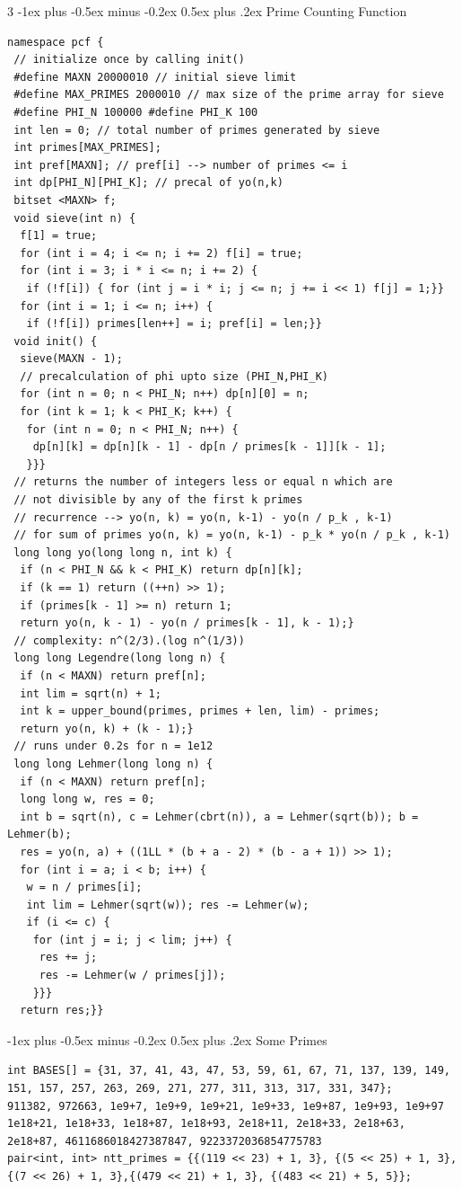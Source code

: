 \documentclass[8pt,a4paper,onesided]{article}
\makeatletter
\renewcommand{\subsection}{\@startsection{subsection}{2}{0mm}
    {-1ex plus -0.5ex minus -0.2ex} %
    {0.5ex plus .2ex}                %
    {\normalfont\large\bfseries}}    %
\makeatother
\begin{document}
\begin{multicols}{3}
\subsection{Prime Counting Function}
\begin{verbatim}
namespace pcf {
 // initialize once by calling init()
 #define MAXN 20000010 // initial sieve limit
 #define MAX_PRIMES 2000010 // max size of the prime array for sieve
 #define PHI_N 100000 #define PHI_K 100
 int len = 0; // total number of primes generated by sieve
 int primes[MAX_PRIMES];
 int pref[MAXN]; // pref[i] --> number of primes <= i
 int dp[PHI_N][PHI_K]; // precal of yo(n,k)
 bitset <MAXN> f;
 void sieve(int n) {
  f[1] = true;
  for (int i = 4; i <= n; i += 2) f[i] = true;
  for (int i = 3; i * i <= n; i += 2) {
   if (!f[i]) { for (int j = i * i; j <= n; j += i << 1) f[j] = 1;}}
  for (int i = 1; i <= n; i++) {
   if (!f[i]) primes[len++] = i; pref[i] = len;}}
 void init() {
  sieve(MAXN - 1);
  // precalculation of phi upto size (PHI_N,PHI_K)
  for (int n = 0; n < PHI_N; n++) dp[n][0] = n;
  for (int k = 1; k < PHI_K; k++) {
   for (int n = 0; n < PHI_N; n++) {
    dp[n][k] = dp[n][k - 1] - dp[n / primes[k - 1]][k - 1];
   }}}
 // returns the number of integers less or equal n which are
 // not divisible by any of the first k primes
 // recurrence --> yo(n, k) = yo(n, k-1) - yo(n / p_k , k-1)
 // for sum of primes yo(n, k) = yo(n, k-1) - p_k * yo(n / p_k , k-1)
 long long yo(long long n, int k) {
  if (n < PHI_N && k < PHI_K) return dp[n][k];
  if (k == 1) return ((++n) >> 1);
  if (primes[k - 1] >= n) return 1;
  return yo(n, k - 1) - yo(n / primes[k - 1], k - 1);}
 // complexity: n^(2/3).(log n^(1/3))
 long long Legendre(long long n) {
  if (n < MAXN) return pref[n];
  int lim = sqrt(n) + 1;
  int k = upper_bound(primes, primes + len, lim) - primes;
  return yo(n, k) + (k - 1);}
 // runs under 0.2s for n = 1e12
 long long Lehmer(long long n) {
  if (n < MAXN) return pref[n];
  long long w, res = 0;
  int b = sqrt(n), c = Lehmer(cbrt(n)), a = Lehmer(sqrt(b)); b = Lehmer(b);
  res = yo(n, a) + ((1LL * (b + a - 2) * (b - a + 1)) >> 1);
  for (int i = a; i < b; i++) {
   w = n / primes[i];
   int lim = Lehmer(sqrt(w)); res -= Lehmer(w);
   if (i <= c) {
    for (int j = i; j < lim; j++) {
     res += j;
     res -= Lehmer(w / primes[j]);
    }}}
  return res;}}
\end{verbatim}
\subsection{Some Primes}
\begin{verbatim}
int BASES[] = {31, 37, 41, 43, 47, 53, 59, 61, 67, 71, 137, 139, 149, 151, 157, 257, 263, 269, 271, 277, 311, 313, 317, 331, 347};
911382, 972663, 1e9+7, 1e9+9, 1e9+21, 1e9+33, 1e9+87, 1e9+93, 1e9+97
1e18+21, 1e18+33, 1e18+87, 1e18+93, 2e18+11, 2e18+33, 2e18+63, 2e18+87, 4611686018427387847, 9223372036854775783
pair<int, int> ntt_primes = {{(119 << 23) + 1, 3}, {(5 << 25) + 1, 3}, {(7 << 26) + 1, 3},{(479 << 21) + 1, 3}, {(483 << 21) + 5, 5}};
\end{verbatim}

\end{multicols}
\end{document}

